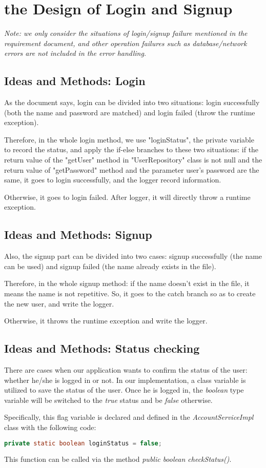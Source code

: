 \documentclass[./report.tex]{subfiles}
\begin{document}
\section{the Design of Login and Signup}
\emph {Note: we only consider the situations of login/signup failure mentioned in the requirement document, and other operation failures such as database/network errors are not included in the error handling.}
 \subsection{Ideas and Methods: Login}
\par As the document says, login can be divided into two situations: login successfully (both the name and password are matched) and login failed (throw the runtime exception).
\par Therefore, in the whole login method, we use "loginStatus", the private variable to record the status, and apply the if-else branches to these two situations: if the return value of the "getUser" method
in "UserRepository" class is not null and the return value of "getPassword" method and the parameter user's password are the same, it goes to login successfully, and the logger record information.
\par Otherwise, it goes to login failed. After logger, it will directly throw a runtime exception.
\subsection{Ideas and Methods: Signup}
\par Also, the signup part can be divided into two cases: signup successfully (the name can be used) and signup failed (the name already exists in the file).
\par Therefore, in the whole signup method: if the name doesn't exist in the file, it means the name is not repetitive. So, it goes to the catch branch so as to create the new user, and write the logger.
\par Otherwise, it throws the runtime exception and write the logger.
\subsection{Ideas and Methods: Status checking}
There are cases when our application wants to confirm the status of the user: whether he/she is logged in or not. In our implementation, a class variable is utilized to save the status of the user. Once he is logged in, the \emph{boolean} type variable will be switched to the \emph{true} status and be \emph{false} otherwise.
\par
Specifically, this flag variable is declared and defined in the \emph{AccountServiceImpl} class with the following code:
\begin{lstlisting}[language=java]
private static boolean loginStatus = false;
\end{lstlisting}
\par
This function can be called via the method \emph{public boolean checkStatus()}.
\end{document}
